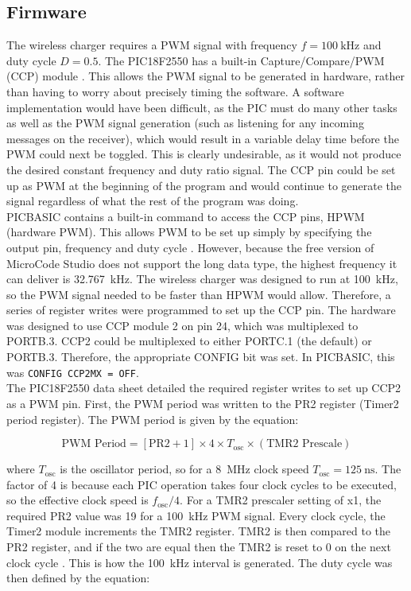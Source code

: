 \subsection{Firmware}
The wireless charger requires a PWM signal with frequency $f=\SI{100}{\kilo\hertz}$ and duty cycle $D=0.5$. The PIC18F2550 has a built-in Capture/Compare/PWM (CCP) module \cite{pic18f2550}. This allows the PWM signal to be generated in hardware, rather than having to worry about precisely timing the software. A software implementation would have been difficult, as the PIC must do many other tasks as well as the PWM signal generation (such as listening for any incoming messages on the receiver), which would result in a variable delay time before the PWM could next be toggled. This is clearly undesirable, as it would not produce the desired constant frequency and duty ratio signal. The CCP pin could be set up as PWM at the beginning of the program and would continue to generate the signal regardless of what the rest of the program was doing.\\

PICBASIC contains a built-in command to access the CCP pins, HPWM (hardware PWM). This allows PWM to be set up simply by specifying the output pin, frequency and duty cycle \cite{picbasic_pro}. However, because the free version of MicroCode Studio does not support the long data type, the highest frequency it can deliver is \SI{32.767}{\kilo\hertz}. The wireless charger was designed to run at \SI{100}{\kilo\hertz}, so the PWM signal needed to be faster than HPWM would allow. Therefore, a series of register writes were programmed to set up the CCP pin. The hardware was designed to use CCP module 2 on pin 24, which was multiplexed to PORTB.3. CCP2 could be multiplexed to either PORTC.1 (the default) or PORTB.3. Therefore, the appropriate CONFIG bit was set. In PICBASIC, this was \verb|CONFIG CCP2MX = OFF|.\\

The PIC18F2550 data sheet \cite{pic18f2550} detailed the required register writes to set up CCP2 as a PWM pin. First, the PWM period was written to the PR2 register (Timer2 period register). The PWM period is given by the equation:

\begin{equation}
\text{PWM Period} = [\text{PR2}+1] \times 4 \times T_\text{osc} \times (\text{TMR2 Prescale})
\end{equation}

where $T_\text{osc}$ is the oscillator period, so for a \SI{8}{\mega\hertz} clock speed $T_\text{osc}=\SI{125}{\nano\second}$. The factor of 4 is because each PIC operation takes four clock cycles to be executed, so the effective clock speed is $f_\text{osc}/4$. For a TMR2 prescaler setting of x1, the required PR2 value was 19 for a \SI{100}{\kilo\hertz} PWM signal. Every clock cycle, the Timer2 module increments the TMR2 register. TMR2 is then compared to the PR2 register, and if the two are equal then the TMR2 is reset to 0 on the next clock cycle \cite{pic18f2550}. This is how the \SI{100}{\kilo\hertz} interval is generated. The duty cycle was then defined by the equation:\\


